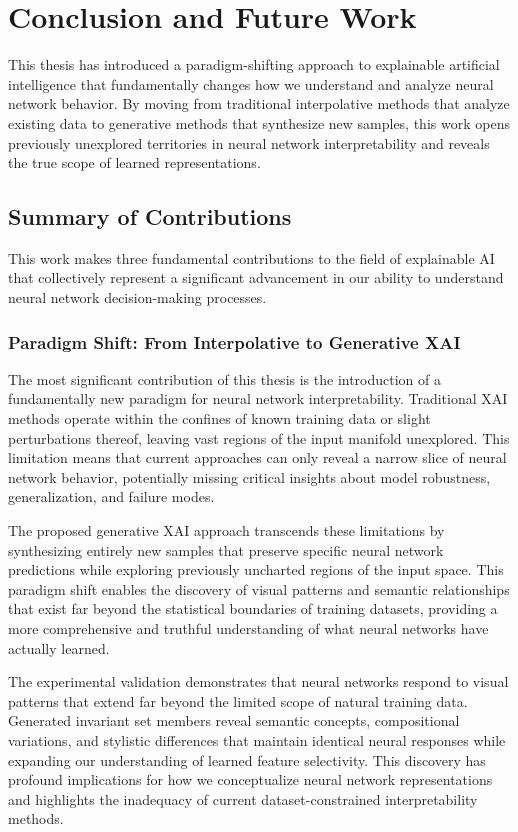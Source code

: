 \chapter{Conclusion and Future Work}\label{r:conclusion}

This thesis has introduced a paradigm-shifting approach to explainable artificial intelligence that fundamentally changes how we understand and analyze neural network behavior. By moving from traditional interpolative methods that analyze existing data to generative methods that synthesize new samples, this work opens previously unexplored territories in neural network interpretability and reveals the true scope of learned representations.

\section{Summary of Contributions}

This work makes three fundamental contributions to the field of explainable AI that collectively represent a significant advancement in our ability to understand neural network decision-making processes.

\subsection{Paradigm Shift: From Interpolative to Generative XAI}

The most significant contribution of this thesis is the introduction of a fundamentally new paradigm for neural network interpretability. Traditional XAI methods operate within the confines of known training data or slight perturbations thereof, leaving vast regions of the input manifold unexplored. This limitation means that current approaches can only reveal a narrow slice of neural network behavior, potentially missing critical insights about model robustness, generalization, and failure modes.

The proposed generative XAI approach transcends these limitations by synthesizing entirely new samples that preserve specific neural network predictions while exploring previously uncharted regions of the input space. This paradigm shift enables the discovery of visual patterns and semantic relationships that exist far beyond the statistical boundaries of training datasets, providing a more comprehensive and truthful understanding of what neural networks have actually learned.

The experimental validation demonstrates that neural networks respond to visual patterns that extend far beyond the limited scope of natural training data. Generated invariant set members reveal semantic concepts, compositional variations, and stylistic differences that maintain identical neural responses while expanding our understanding of learned feature selectivity. This discovery has profound implications for how we conceptualize neural network representations and highlights the inadequacy of current dataset-constrained interpretability methods.

